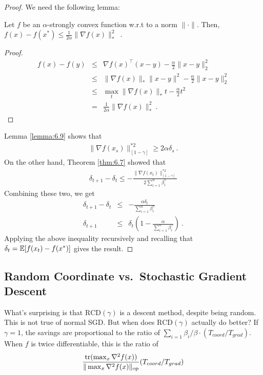	\begin{proof} We need the following lemma:
  \begin{lemma}
    \label{lemma:6.9} 
    Let $f$ be an $\alpha$-strongly convex function w.r.t to a norm
    $\|\cdot\|$. Then, $f(x) - f(x^*) \le \frac{1}{2\alpha} \|\nabla
    f(x)\|_*^2$\ .
	 \end{lemma}
	 \begin{proof}
	 \begin{eqnarray*}
     f(x) - f(y)
     &\le& \nabla f(x)^\top (x -y ) - \frac{\alpha}{2}\|x - y\|^2_2\\
	   &\le& \|\nabla f(x)\|_* \|x - y\|^2 - \frac{\alpha}{2}\|x - y\|^2_2\\
	   &\le& \max_t \|\nabla f(x)\|_* t - \frac{\alpha}{2}t^2\\
	 	 &=&  \frac{1}{2\alpha} \|\nabla f(x)\|_*^2 \ .
	 \end{eqnarray*}
	 \end{proof}

   Lemma \ref{lemma:6.9} shows that 
	 \begin{eqnarray*}
     \|\nabla f(x_s)\|^{*2}_{[1-\gamma]}
     \ge 2 \alpha \delta_s \ .
	 \end{eqnarray*}
   On the other hand, Theorem \ref{thm:6.7} showed that
   \begin{eqnarray}
   \delta_{t+1} - \delta_t \le -\frac{\|\nabla f(x_t)\|^{*2}_{[1-\gamma]}}{2\sum_{i=1}^n \beta_i^{\gamma}} 
   \end{eqnarray}
   Combining these two, we get
	 \begin{eqnarray}
     \delta_{t+1} - \delta_t &\le& -\frac{\alpha \delta_t}{\sum_{i=1}^n \beta_i^{\gamma}}  \\
     \delta_{t+1} &\le&  \delta_t \left(1  -\frac{\alpha}{\sum_{i=1}^n \beta_i^{\gamma}} \right)~.
	 \end{eqnarray}
   Applying the above inequality recursively and recalling that
   $\delta_t = \operatorname*{\mathbb{E}}[f(x_t) - f(x^*)]$ gives the result.

	\end{proof}

	\subsection{Random Coordinate vs.\ Stochastic Gradient Descent}
	What's surprising is that $\mathrm{RCD}(\gamma)$ is a descent method, despite being random. This is not true of normal SGD. 
	But when does $\mathrm{RCD}(\gamma)$ actually do better? If $\gamma = 1$, the savings are proportional to the ratio of $\sum_{i=1} \beta_i / \beta \cdot (T_{coord}/T_{grad})$. When $f$ is twice differentiable, this is the ratio of 
	\begin{eqnarray}
	\frac{\mathrm{tr}(\max_{x} \nabla^2 f(x))}{\|\max_{x} \nabla^2 f(x)\|_{\mathrm{op}}} (T_{coord}/T_{grad})
	\end{eqnarray}
